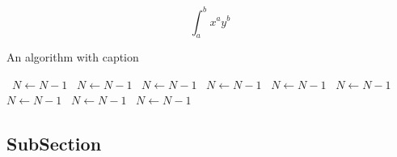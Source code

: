 \documentclass[a4paper]{article}
\begin{document}
\[ \int_{a}^{b}{x^{a}y^{b}} \]

\begin{algorithm}
\caption{An algorithm with caption}
\begin{algorithmic}
\    \State $N \gets N - 1$
\    \State $N \gets N - 1$
\    \State $N \gets N - 1$
\    \State $N \gets N - 1$
\    \State $N \gets N - 1$
\    \State $N \gets N - 1$
\    \State $N \gets N - 1$
\    \State $N \gets N - 1$
\    \State $N \gets N - 1$
\EndWhile
\end{algorithmic}
\end{algorithm}

\subsection{SubSection}
\end{document}
